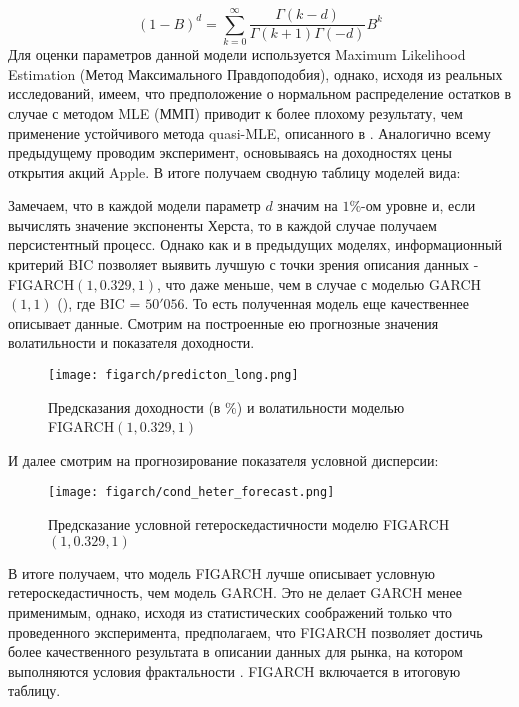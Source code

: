 \begin{equation}
	(1 - B)^d = \sum_{k = 0}^\infty \frac{\Gamma(k - d)}{\Gamma(k + 1)\Gamma(-d)}B^k
\end{equation}
Для оценки параметров данной модели используется Maximum Likelihood Estimation (Метод Максимального Правдоподобия), однако, исходя из реальных исследований, имеем, что предположение о нормальном распределение остатков в случае с методом MLE (ММП) приводит к более плохому результату, чем применение устойчивого метода quasi-MLE, описанного в \cite{weiss1986asymptotic}. Аналогично всему предыдущему проводим эксперимент, основываясь на доходностях цены открытия акций Apple. В итоге получаем сводную таблицу моделей вида:



\noindent Замечаем, что в каждой модели параметр $d$ значим на $1\%$-ом уровне и, если вычислять значение экспоненты Херста, то в каждой случае получаем персистентный процесс. Однако как и в предыдущих моделях, информационный критерий BIC позволяет выявить лучшую с точки зрения описания данных - FIGARCH$(1, 0.329, 1)$, что даже меньше, чем в случае с моделью GARCH$(1, 1)$ (), где BIC = $50'056$. То есть полученная модель еще качественнее описывает данные. Смотрим на построенные ею прогнозные значения волатильности и показателя доходности.
\begin{figure}[H]
	\centering
	\texttt{[image: figarch/predicton\_long.png]}
	\caption{Предсказания доходности (в \%) и волатильности моделью FIGARCH$(1, 0.329, 1)$}
\end{figure}
\noindent И далее смотрим на прогнозирование показателя условной дисперсии:
\begin{figure}[H]
	\centering
	\texttt{[image: figarch/cond\_heter\_forecast.png]}
	\caption{Предсказание условной гетероскедастичности моделю FIGARCH$(1, 0.329, 1)$}
\end{figure}
\noindent В итоге получаем, что модель FIGARCH лучше описывает условную гетероскедастичность, чем модель GARCH. Это не делает GARCH менее применимым, однако, исходя из статистических соображений только что проведенного эксперимента, предполагаем, что FIGARCH позволяет достичь более качественного результата в описании данных для рынка, на котором выполняются условия фрактальности \cite{fractal_market}. FIGARCH включается в итоговую таблицу.